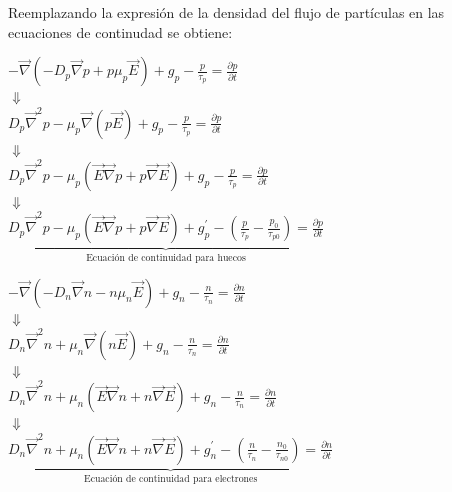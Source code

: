 \documentclass[oneside]{book}
\numberwithin{equation}{section}
\numberwithin{figure}{section}
\numberwithin{table}{section}
\begin{document}
		Reemplazando la expresión de la densidad del flujo de partículas en las ecuaciones de continudad se obtiene:\\
		
				\begin{minipage}[t]{0.45\textwidth}
					\begin{center}
						$\displaystyle -\vec{\nabla}(-D_p\vec{\nabla}p+p\mu_p\vec{E})+g_p-\frac{p}{\tau_p}=\frac{\partial p}{\partial t}$\\
						$\Downarrow$\\
						$\displaystyle D_p\vec{\nabla}^2p-\mu_p\vec{\nabla}(p\vec{E})+g_p-\frac{p}{\tau_p}=\frac{\partial p}{\partial t}$\\
						$\Downarrow$\\
						$\displaystyle D_p\vec{\nabla}^2p-\mu_p(\vec{E}\vec{\nabla} p+p\vec{\nabla}\vec{E})+g_p-\frac{p}{\tau_p}=\frac{\partial p}{\partial t}$\\
						$\Downarrow$\\
						$\underbrace{\boxed{\displaystyle D_p\vec{\nabla}^2p-\mu_p(\vec{E}\vec{\nabla} p+p\vec{\nabla}\vec{E})+g_p^\prime-\left(\frac{p}{\tau_p}-\frac{p_0}{\tau_{p0}}\right)=\frac{\partial p}{\partial t}}}_{\text{Ecuación de continuidad para huecos}}$\\
					\end{center}
				\end{minipage}
				\begin{minipage}[t]{0.5\textwidth}
					\begin{center}
						$\displaystyle -\vec{\nabla}(-D_n\vec{\nabla}n-n\mu_n\vec{E})+g_n-\frac{n}{\tau_n}=\frac{\partial n}{\partial t}$\\
						$\Downarrow$\\
						$\displaystyle D_n\vec{\nabla}^2n+\mu_n\vec{\nabla}(n\vec{E})+g_n-\frac{n}{\tau_n}=\frac{\partial n}{\partial t}$\\
						$\Downarrow$\\
						$\displaystyle D_n\vec{\nabla}^2n+\mu_n(\vec{E}\vec{\nabla} n+n\vec{\nabla}\vec{E})+g_n-\frac{n}{\tau_n}=\frac{\partial n}{\partial t}$\\
						$\Downarrow$\\
						$\underbrace{\boxed{\displaystyle D_n\vec{\nabla}^2n+\mu_n(\vec{E}\vec{\nabla} n+n\vec{\nabla}\vec{E})+g_n^\prime-\left(\frac{n}{\tau_n}-\frac{n_0}{\tau_{n0}}\right)=\frac{\partial n}{\partial t}}}_{\text{Ecuación de continuidad para electrones}}$\\
					\end{center}
				\end{minipage}
				
\end{document}

